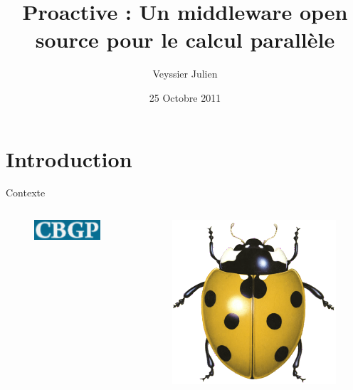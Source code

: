\documentclass{beamer}
\title{Proactive : Un middleware open source pour le calcul parallèle}
\author{Veyssier Julien}
\institute{CBGP - INRA}
\date{25 Octobre 2011}
\begin{document}
\begin{frame}
\titlepage
\end{frame}

\begin{frame}
\tableofcontents
\end{frame}

\section[Introduction]{Introduction}
\begin{frame}
	\tableofcontents[currentsection]
\end{frame}

\begin{frame}{Contexte}
	\begin{columns}
	\begin{column}[l]{0.5\linewidth}
        \begin{columns}
        \begin{column}[l]{0.5\linewidth}
        \begin{figure}
            \centering
            \includegraphics[scale=0.32]{cbgp.png}
        \end{figure}
        \end{column}
        \begin{column}[r]{0.5\linewidth}
        \begin{figure}
            \centering
            \includegraphics[scale=0.32]{cocci.png}

\end{figure}
\end{column}
\end{columns}
\end{column}
\end{columns}
\end{frame}
\end{document}

